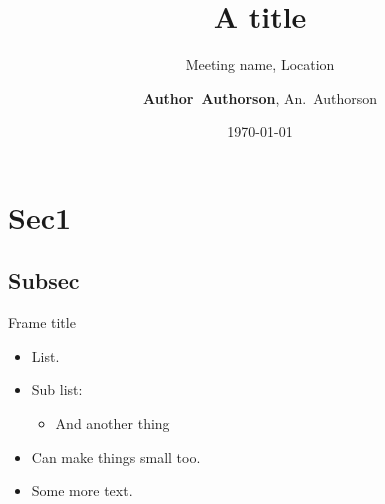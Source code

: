 \documentclass{beamer}
\title{A title}
\date{\today}
\subtitle{Meeting name, Location}
\author[S. name]{\textbf{Author~Authorson}, An.~Authorson}
\begin{document}
\begin{frame}
\titlepage
\end{frame}

\begin{frame}
\tableofcontents
\end{frame}

\section{Sec1}
\subsection{Subsec}
\begin{frame}{Frame title}
\begin{tikzoverlayarea}
  \begin{tikztextarea}{0.5\textwidth}
		\begin{itemize}
			\item List.
			\item Sub list:
			\begin{itemize}
				\item And another thing
			\end{itemize}
			\item {\tiny Can make things small too.}
      \item Some more text.
		\end{itemize}
  \end{tikztextarea}
\end{tikzoverlayarea}
\end{frame}

\begin{frame}
\thanksshield
\end{frame}

\begin{frame}
\backups
\end{frame}
\end{document}
